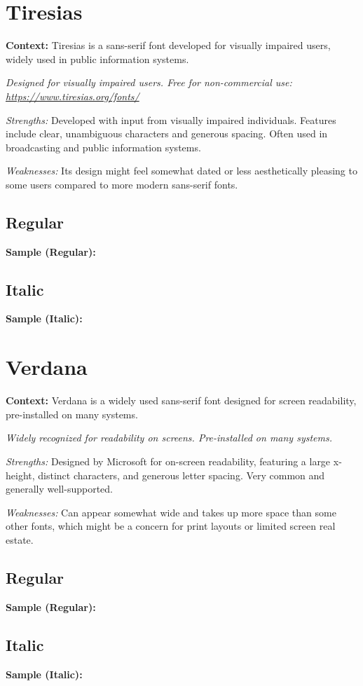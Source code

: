 \pagebreak
\section{Tiresias}\label{app5:sec:tiresias}
\noindent
\textbf{Context:} Tiresias is a sans-serif font developed for visually impaired users, widely used in public information systems.

\emph{Designed for visually impaired users. Free for non-commercial use: \url{https://www.tiresias.org/fonts/}}
\begin{raggedright}
	\emph{Strengths:} Developed with input from visually impaired individuals. Features include clear, unambiguous characters and generous spacing. Often used in broadcasting and public information systems.

	\emph{Weaknesses:} Its design might feel somewhat dated or less aesthetically pleasing to some users compared to more modern sans-serif fonts.

	\subsection{Regular}
	\noindent\textbf{Sample (Regular):}
	\FontSample{\tiresiasfont}

	\subsection{Italic}
	\noindent\textbf{Sample (Italic):}
	\FontSample{{\tiresiasfont\itshape}}
\end{raggedright}


\pagebreak
\section{Verdana}\label{app5:sec:verdana}
\noindent
\textbf{Context:} Verdana is a widely used sans-serif font designed for screen readability, pre-installed on many systems.

\emph{Widely recognized for readability on screens. Pre-installed on many systems.}
\begin{raggedright}
	\emph{Strengths:} Designed by Microsoft for on-screen readability, featuring a large x-height, distinct characters, and generous letter spacing. Very common and generally well-supported.

	\emph{Weaknesses:} Can appear somewhat wide and takes up more space than some other fonts, which might be a concern for print layouts or limited screen real estate.

	\subsection{Regular}
	\noindent\textbf{Sample (Regular):}
	\FontSample{\verdanafont}

	\subsection{Italic}
	\noindent\textbf{Sample (Italic):}
	\FontSample{{\verdanafont\itshape}}
\end{raggedright}




